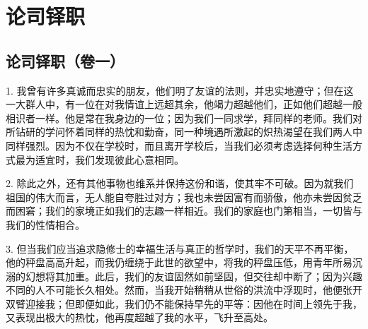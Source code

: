 
\chapter{论司铎职}


\newline{}\newline{}\newline{}\newline{}\newline{}\par



\section{论司铎职（卷一）}

1. 我曾有许多真诚而忠实的朋友，他们明了友谊的法则，并忠实地遵守；但在这一大群人中，有一位在对我情谊上远超其余，他竭力超越他们，正如他们超越一般相识者一样。他是常在我身边的一位；因为我们一同求学，拜同样的老师。我们对所钻研的学问怀着同样的热忱和勤奋，同一种境遇所激起的炽热渴望在我们两人中同样强烈。因为不仅在学校时，而且离开学校后，当我们必须考虑选择何种生活方式最为适宜时，我们发现彼此心意相同。\par

2. 除此之外，还有其他事物也维系并保持这份和谐，使其牢不可破。因为就我们祖国的伟大而言，无人能自夸胜过对方；我也未尝因富有而骄傲，他亦未尝因贫乏而困窘；我们的家境正如我们的志趣一样相近。我们的家庭也门第相当，一切皆与我们的性情相合。\par

3. 但当我们应当追求隐修士的幸福生活与真正的哲学时，我们的天平不再平衡，他的秤盘高高升起，而我仍缠绕于此世的欲望中，将我的秤盘压低，用青年所易沉溺的幻想将其加重。此后，我们的友谊固然如前坚固，但交往却中断了；因为兴趣不同的人不可能长久相处。然而，当我开始稍稍从世俗的洪流中浮现时，他便张开双臂迎接我；但即便如此，我们仍不能保持早先的平等：因他在时间上领先于我，又表现出极大的热忱，他再度超越了我的水平，飞升至高处。\par

